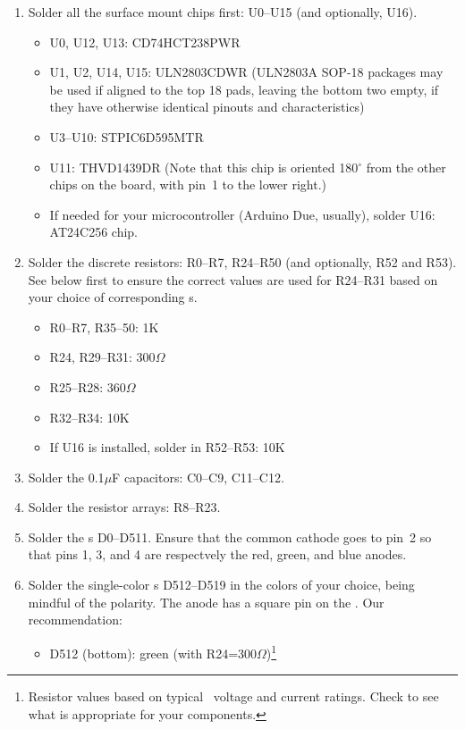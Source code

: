 \begin{enumerate}
	\item Solder all the surface mount chips first: U0--U15 (and optionally, U16).
		\begin{itemize}
			\item U0, U12, U13: CD74HCT238PWR
			\item U1, U2, U14, U15: ULN2803CDWR (ULN2803A SOP-18 packages may be used if aligned to the top 18 pads, leaving the bottom two empty, if they have otherwise identical pinouts and characteristics)
			\item U3--U10: STPIC6D595MTR
			\item U11: THVD1439DR (Note that this chip is oriented 180$^{\circ}$ from the other chips on the board, with pin~1 to the lower right.)
			\item If needed for your microcontroller (Arduino Due, usually), solder U16: AT24C256  chip.
		\end{itemize}
	\item Solder the discrete resistors: R0--R7, R24--R50 (and optionally, R52 and R53). See below first to ensure the correct values are used
		for R24--R31 based on your choice of corresponding \led s.
		\begin{itemize}
			\item R0--R7, R35--50: 1K
			\item R24, R29--R31: 300$\Omega$
			\item R25--R28: 360$\Omega$
			\item R32--R34: 10K
			\item If U16 is installed, solder in R52--R53: 10K
		\end{itemize}
	\item Solder the 0.1$\mu$F capacitors: C0--C9, C11--C12.
	\item Solder the resistor arrays: R8--R23.
	\item Solder the  \led s D0--D511. Ensure that the common cathode goes to pin~2 so that pins 1, 3, and 4
		are respectvely the red, green, and blue anodes.
	\item Solder the single-color \led s D512--D519 in the colors of your choice, being mindful of the polarity. The anode has a square pin on the . Our recommendation:
		\begin{itemize}
			\item D512 (bottom): green (with R24=300$\Omega$)\footnote{Resistor values based on typical \led\ voltage and current ratings. Check to see what is appropriate for your components.}

\end{itemize}
\end{enumerate}
